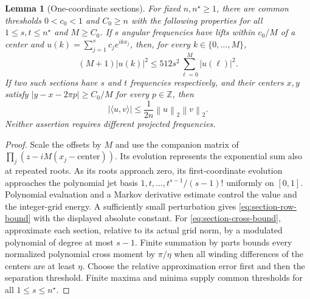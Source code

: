 \documentclass[11pt]{article}
\newtheorem{lemma}[theorem]{Lemma}
\theoremstyle{definition}\newtheorem{definition}[theorem]{Definition}
\theoremstyle{remark}\newtheorem{remark}[theorem]{Remark}
\newcommand{\norm}[1]{\left\lVert#1\right\rVert}
\newcommand{\abs}[1]{\left|#1\right|}
\begin{document}
\begin{lemma}[One-coordinate sections]\label{lem:angular-sections}
For fixed $n,n^\star\ge1$, there are common thresholds
$0<c_0<1$ and $C_0\ge n$ with the following properties for all
$1\le s,t\le n^\star$ and $M\ge C_0$.
If $s$ angular frequencies have lifts within $c_0/M$ of a center and
$u(k)=\sum_{j=1}^s c_j e^{ikx_j}$, then, for every
$k\in\{0,\ldots,M\}$,
\begin{equation}\label{eq:section-row-bound}
 (M+1)\abs{u(k)}^2\le512s^2\sum_{\ell=0}^M\abs{u(\ell)}^2.
\end{equation}
If two such sections have $s$ and $t$ frequencies respectively, and
their centers $x,y$ satisfy
$\abs{y-x-2\pi p}\ge C_0/M$ for every $p\in\mathbb Z$, then
\begin{equation}\label{eq:section-cross-bound}
 \abs{\langle u,v\rangle}\le\frac1{2n}\norm{u}_2\norm{v}_2.
\end{equation}
Neither assertion requires different projected frequencies.
\end{lemma}
\begin{proof}
Scale the offsets by $M$ and use the companion matrix of
$\prod_j(z-iM(x_j-\text{center}))$. Its evolution represents the exponential
sum also at repeated roots. As its roots approach zero, its first-coordinate
evolution approaches the polynomial jet basis
$1,t,\ldots,t^{s-1}/(s-1)!$ uniformly on $[0,1]$.
Polynomial evaluation and a Markov derivative estimate control the value
and the integer-grid energy. A sufficiently small perturbation gives
\eqref{eq:section-row-bound} with the displayed absolute constant.
For \eqref{eq:section-cross-bound}, approximate each section, relative to
its actual grid norm, by a modulated polynomial of degree at most $s-1$.
Finite summation by parts bounds every normalized polynomial cross moment
by $\pi/\eta$ when all winding differences of the centers are at least
$\eta$. Choose the relative approximation error first and then the
separation threshold. Finite maxima and minima supply common thresholds
for all $1\le s\le n^\star$.
\end{proof}
\end{document}
